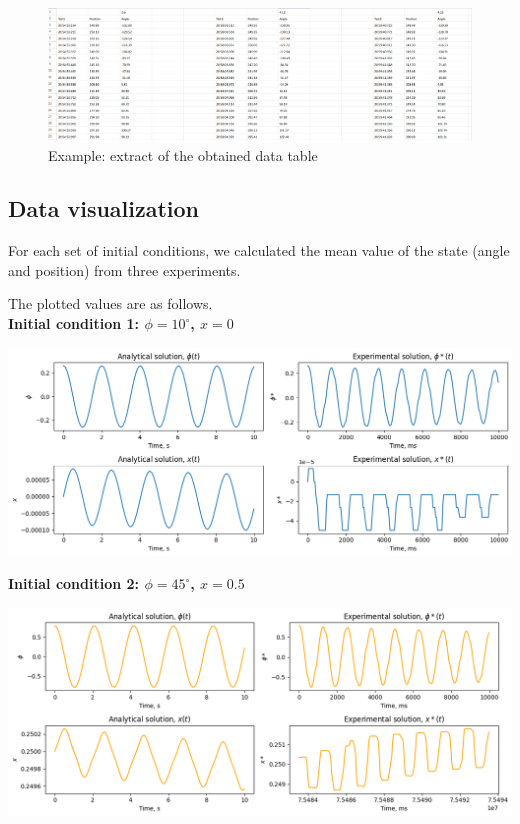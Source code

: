 \documentclass{article}
\begin{document}
\begin{figure}[h]
  \centering
  \includegraphics[scale=0.21]{data/measurements.png}
  \caption{Example: extract of the obtained data table}
\end{figure}

\subsection{Data visualization}
For each set of initial conditions, we calculated the mean value of the state (angle and position) from three experiments. 

The plotted values are as follows.\\

\textbf{Initial condition 1: $\phi = 10^\circ$, $x = 0$}

\includegraphics*[scale=0.5]{plots/init1.png}

\textbf{Initial condition 2: $\phi = 45^\circ$, $x = 0.5$}

\includegraphics*[scale=0.5]{plots/init2.png}\\\\
\end{document}
